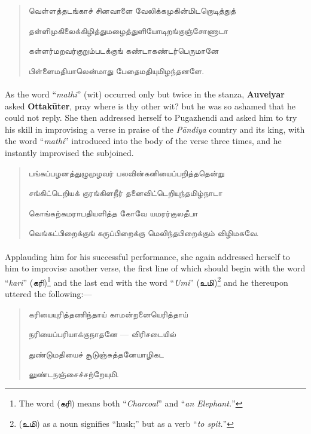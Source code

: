 \documentclass{article}
\newcommand{\TamilText}[1]{\texttamil{#1}}
\newcommand{\tam}[1]{\TamilText{#1}}
\begin{document}
\begin{quotation}\small
\tam{வெள்ளத்தடங்காச்‌ சினவாளை வேலிக்கமுகின்மிடறொடித்துத்}

\tam{தள்ளிமுகிலைக்கிழித்துமழைத்துளியோடிறங்குஞ்சோணாடா}

\tam{கள்ளர்மறவர்குறும்படக்குங் கண்டாகண்டர்பெருமானே}

\tam{பிள்ளைமதியாலென்மாது பேதைமதியுமிழந்தனளே}.
\end{quotation}
\paragraph{}
As the word ``\emph{mathi}'' (wit) occurred only but twice in the stanza, \textbf{Auveiyar} asked \textbf{Ottak\={u}ter}, pray where is thy other wit? but he was so ashamed that he could not reply. She then addressed herself to Pugazhendi and asked him to try his skill in improvising a verse in praise of the \emph{P\={a}ndiya} country and its king, with the word ``\emph{mathi}'' introduced into the body of the verse three times, and he instantly improvised the subjoined.
\begin{quotation}\small
\tam{பங்கப்பழனத்துழுமுழவர்‌ பலவின்கனியைப்பறித்ததென்று}

\tam{சங்கிட்டெறியக் குரங்கிளநீர்‌ தனைவிட்டெறியுந்தமிழ்நாடா}

\tam{கொங்கற்கமராபதியளித்த கோவே யமரர்குலதீபா}

\tam{வெங்கட்பிறைக்குங்‌ கருப்பிறைக்கு மெலிந்தபிறைக்கும்‌ விழிமகவே}.
\end{quotation}
\paragraph{}
Applauding him for his successful performance, she again addressed herself to him to improvise another verse, the first line of which should begin with the word ``\emph{kari}'' (\tam{கரி})\footnote{The word (\tam{கரி}) means both ``\emph{Charcoal}'' and ``\emph{an Elephant.}''} and the last end with the word ``\emph{Umi}'' (\tam{உமி})\footnote{(\tam{உமி}) as a noun signifies ``husk;'' but as a verb ``\emph{to spit.}''} and he thereupon uttered the following:---
\begin{quotation}\small
\tam{கரியையுரித்தணிந்தாய்‌ காமன்றனையெரித்தாய்}

\tam{நரியைப்பரியாக்குநாதனே} --- \tam{விரிசடையில்‌}

\tam{துண்டுமதியைச்‌ சூடுஞ்சுத்தனேயாழிகட}

\tam{லுண்டநஞ்சைச்சற்றேயுமி}.
\end{quotation}
\end{document}
